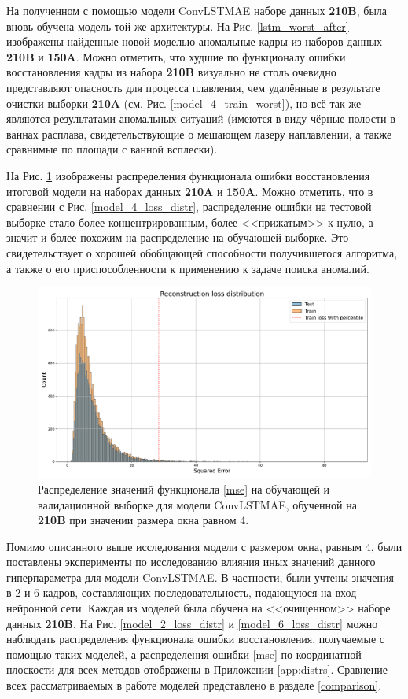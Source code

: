 \documentclass{article}
\begin{document}
    На полученном с помощью модели ConvLSTMAE наборе данных \textbf{210B}, была вновь обучена модель той же архитектуры. На Рис. \ref{lstm_worst_after} изображены найденные новой моделью аномальные кадры из наборов данных \textbf{210B} и \textbf{150A}. Можно отметить, что худшие по функционалу ошибки восстановления кадры из набора \textbf{210B} визуально не столь очевидно представляют опасность для процесса плавления, чем удалённые в результате очистки выборки \textbf{210A} (см. Рис. \ref{model_4_train_worst}), но всё так же являются результатами аномальных ситуаций (имеются в виду чёрные полости в ваннах расплава, свидетельствующие о мешающем лазеру наплавлении, а также сравнимые по площади с ванной всплески).

    На Рис. \ref{model_4_loss_distr_after} изображены распределения функционала ошибки восстановления итоговой модели на наборах данных \textbf{210A} и \textbf{150A}. Можно отметить, что в сравнении с Рис. \ref{model_4_loss_distr}, распределение ошибки на тестовой выборке стало более концентрированным, более <<прижатым>> к нулю, а значит и более похожим на распределение на обучающей выборке. Это свидетельствует о хорошей обобщающей способности получившегося алгоритма, а также о его приспособленности к применению к задаче поиска аномалий.


    \begin{figure}[]
        \centering
        \includegraphics[scale=0.3]{model_4_loss_distr_after.pdf}
        \caption{Распределение значений функционала \eqref{mse} на обучающей и валидационной выборке для модели ConvLSTMAE, обученной на \textbf{210B} при значении размера окна равном 4.}
        \label{model_4_loss_distr_after}
    \end{figure}

    Помимо описанного выше исследования модели с размером окна, равным 4, были поставлены эксперименты по исследованию влияния иных значений данного гиперпараметра для модели ConvLSTMAE. В частности, были учтены значения в 2 и 6 кадров, составляющих последовательность, подающуюся на вход нейронной сети. Каждая из моделей была обучена на <<очищенном>> наборе данных \textbf{210B}. На Рис. \ref{model_2_loss_distr} и \ref{model_6_loss_distr} можно наблюдать распределения функционала ошибки восстановления, получаемые с помощью таких моделей, а распределения ошибки \eqref{mse} по координатной плоскости для всех методов отображены в Приложении \ref{app:distrs}. Сравнение всех рассматриваемых в работе моделей представлено в разделе \ref{comparison}.
\end{document}
